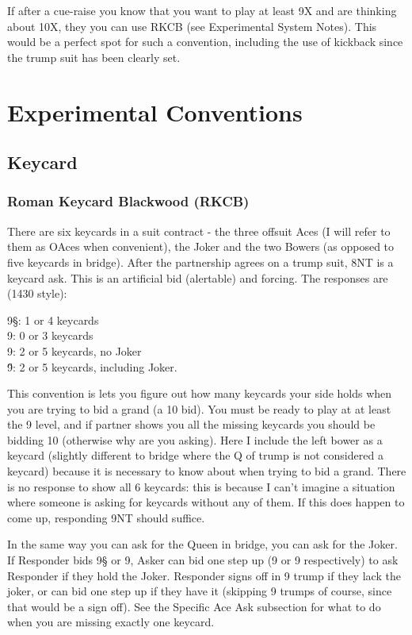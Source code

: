 \documentclass[a4paper]{JoshCards}
\begin{document}
If after a cue-raise you know that you want to play at least 9X and are thinking about 10X, they you can use RKCB (see Experimental System Notes). This would be a perfect spot for such a convention, including the use of kickback since the trump suit has been clearly set.


\newpage

\chapter*{Experimental Conventions}

\section*{Keycard}

\subsection*{Roman Keycard Blackwood (RKCB)}

There are six keycards in a suit contract - the three offsuit Aces (I will refer to them as OAces when convenient), the Joker and the two Bowers (as opposed to five keycards in bridge). After the partnership agrees on a trump suit, 8NT is a keycard ask. This is an artificial bid (alertable) and forcing. The responses are (1430 style):

{9\S}: 1 or 4 keycards\\
{9\C}: 0 or 3 keycards\\
{9\D}: 2 or 5 keycards, no Joker\\ 
{9\H}: 2 or 5 keycards, including Joker.

This convention is lets you figure out how many keycards your side holds when you are trying to bid a grand (a 10 bid). You must be ready to play at at least the 9 level, and if partner shows you all the missing keycards you should be bidding 10 (otherwise why are you asking). Here I include the left bower as a keycard (slightly different to bridge where the Q of trump is not considered a keycard) because it is necessary to know about when trying to bid a grand. There is no response to show all 6 keycards: this is because I can't imagine a situation where someone is asking for keycards without any of them. If this does happen to come up, responding 9NT should suffice.

In the same way you can ask for the Queen in bridge, you can ask for the Joker. If Responder bids {9\S} or {9\C}, Asker can bid one step up ({9\C} or {9\D} respectively) to ask Responder if they hold the Joker. Responder signs off in 9 trump if they lack the joker, or can bid one step up if they have it (skipping 9 trumps of course, since that would be a sign off). See the Specific Ace Ask subsection for what to do when you are missing exactly one keycard.
\end{document}
